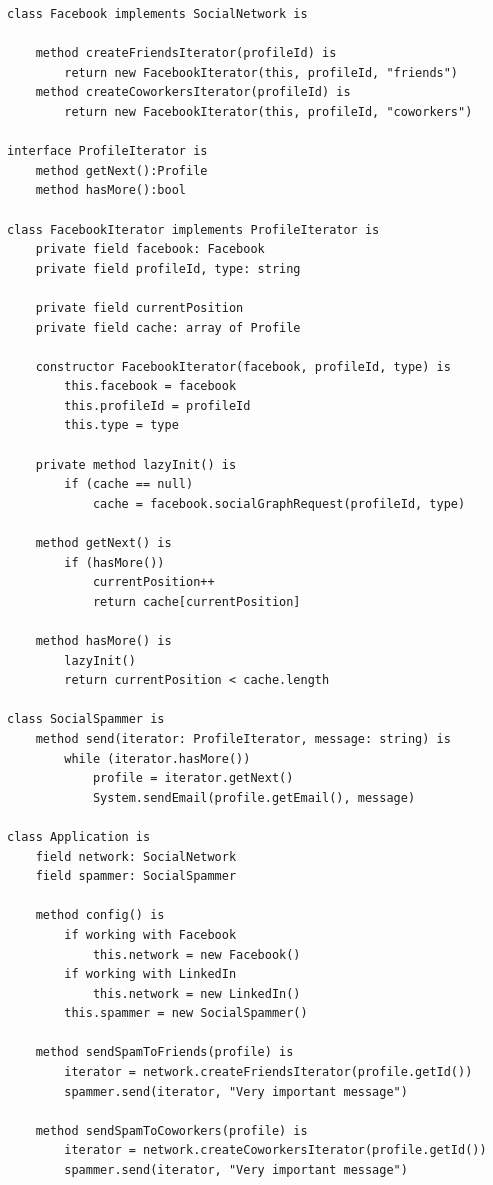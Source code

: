 \begin{lstlisting}
class Facebook implements SocialNetwork is

    method createFriendsIterator(profileId) is
        return new FacebookIterator(this, profileId, "friends")
    method createCoworkersIterator(profileId) is
        return new FacebookIterator(this, profileId, "coworkers")

interface ProfileIterator is
    method getNext():Profile
    method hasMore():bool

class FacebookIterator implements ProfileIterator is
    private field facebook: Facebook
    private field profileId, type: string

    private field currentPosition
    private field cache: array of Profile

    constructor FacebookIterator(facebook, profileId, type) is
        this.facebook = facebook
        this.profileId = profileId
        this.type = type

    private method lazyInit() is
        if (cache == null)
            cache = facebook.socialGraphRequest(profileId, type)

    method getNext() is
        if (hasMore())
            currentPosition++
            return cache[currentPosition]

    method hasMore() is
        lazyInit()
        return currentPosition < cache.length

class SocialSpammer is
    method send(iterator: ProfileIterator, message: string) is
        while (iterator.hasMore())
            profile = iterator.getNext()
            System.sendEmail(profile.getEmail(), message)

class Application is
    field network: SocialNetwork
    field spammer: SocialSpammer

    method config() is
        if working with Facebook
            this.network = new Facebook()
        if working with LinkedIn
            this.network = new LinkedIn()
        this.spammer = new SocialSpammer()

    method sendSpamToFriends(profile) is
        iterator = network.createFriendsIterator(profile.getId())
        spammer.send(iterator, "Very important message")

    method sendSpamToCoworkers(profile) is
        iterator = network.createCoworkersIterator(profile.getId())
        spammer.send(iterator, "Very important message")
\end{lstlisting}

